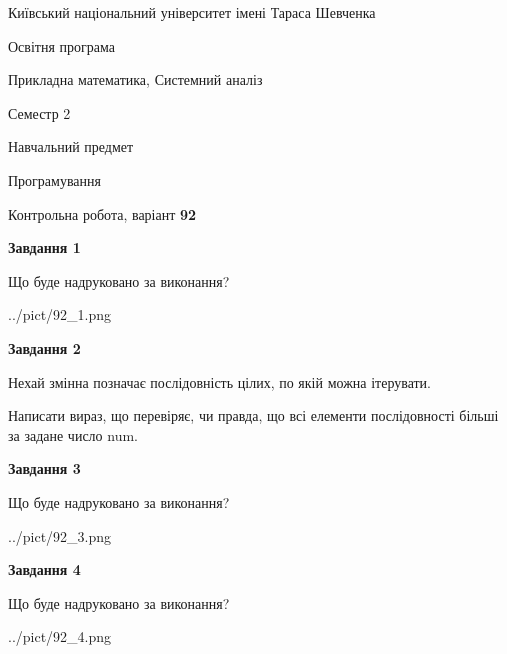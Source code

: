 \documentclass[12pt, ukrainian]{article}
\begin{document}
{{\begin {small}\par
{ \center  Київський національний університет імені Тараса Шевченка \par}
{\parbox {5 cm}{Освітня програма \hfill}{\parbox {8 cm}{Прикладна математика, Системний аналіз \hfill}}\parbox {5 cm}{\hfill Семестр 2}}\par
{\parbox {5 cm} {Навчальний предмет \hfill}\parbox {7 cm}{Програмування \hfill}\parbox {6cm}{\hfill}\par}\vspace{-7pt} \end{small}}{\center Контрольна робота, варіант  \No \textbf
{ 92 }\par}}
{
\begin {large}
{\begin {center}\textbf{Завдання 1}\end {center}}\par
Що буде надруковано за виконання?\par\par
\begin{center}
	{../pict/92_1.png}
\end{center}
\newpage

{\begin {center}\textbf{Завдання 2}\end {center}}\par
Нехай змінна  позначає послідовність цілих, по якій можна ітерувати.

Написати вираз, що перевіряє, чи правда, що всі елементи послідовності більші за задане число num.\par
\newpage

{\begin {center}\textbf{Завдання 3}\end {center}}\par
Що буде надруковано за виконання?
\begin{center}
	{../pict/92_3.png}
\end{center}
\newpage

{\begin {center}\textbf{Завдання 4}\end {center}}\par
Що буде надруковано за виконання?\par
\begin{center}
	{../pict/92_4.png}
\end{center}
\newpage


\end{large}}
\end{document}
